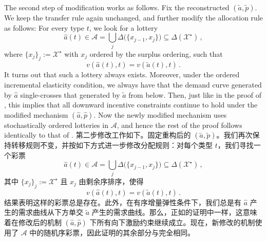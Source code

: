 \documentclass[12pt,letterpaper]{article}
\newenvironment{original}{\color{black}\noindent}{}
\newenvironment{translation}{\color{blue}\noindent}{}
\theoremstyle{plain}
\theoremstyle{definition}
\theoremstyle{remark}
\renewcommand{\1}{\mathds{1}}
\newcommand{\X}{\mathcal{X}}
\theoremstyle{definition}
\begin{document}
\begin{original}
The second step of modification works as follows. Fix the reconstructed $(\tilde{a}, \tilde{p})$. We keep the transfer rule again unchanged, and further modify the allocation rule as follows: For every type $t$, we look for a lottery
\[\hat{a}(t) \in \mathcal{A} = \bigcup_{j} \Delta\big(\{x_{j-1}, x_j\}\big) \subseteq \Delta(\X^\star)\,,\]
where $\{x_j\}_j := \X^\star$ with $x_j$ ordered by the surplus ordering, such that
\[v(\hat{a}(t), t) = v(\tilde{a}(t), t)\,.\]
It turns out that such a lottery always exists. Moreover, under the ordered incremental elasticity condition, we always have that the demand curve generated by $\hat{a}$ single-crosses that generated by $\tilde{a}$ from below. Then, just like in the proof of , this implies that all downward incentive constraints continue to hold under the modified mechanism $(\hat{a}, \hat{p})$. Now the newly modified mechanism uses stochastically ordered lotteries in $\mathcal{A}$, and hence the rest of the proof follows identically to that of .
\end{original}
\begin{translation}
第二步修改工作如下。固定重构后的 $(\tilde{a}, \tilde{p})$。我们再次保持转移规则不变，并按如下方式进一步修改分配规则：对每个类型 $t$，我们寻找一个彩票
\[\hat{a}(t) \in \mathcal{A} = \bigcup_{j} \Delta\big(\{x_{j-1}, x_j\}\big) \subseteq \Delta(\X^\star)\,,\]
其中 $\{x_j\}_j := \X^\star$ 且 $x_j$ 由剩余序排序，使得
\[v(\hat{a}(t), t) = v(\tilde{a}(t), t)\,.\]
结果表明这样的彩票总是存在。此外，在有序增量弹性条件下，我们总是有 $\hat{a}$ 产生的需求曲线从下方单交 $\tilde{a}$ 产生的需求曲线。那么，正如的证明中一样，这意味着在修改后的机制 $(\hat{a}, \hat{p})$ 下所有向下激励约束继续成立。现在，新修改的机制使用了 $\mathcal{A}$ 中的随机序彩票，因此证明的其余部分与完全相同。
\end{translation}
\end{document}
